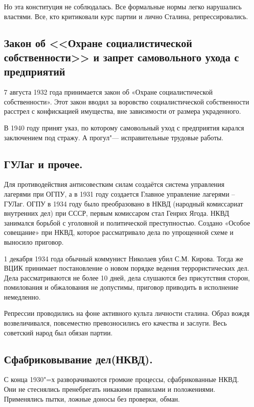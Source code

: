 Но эта конституция не соблюдалась. Все формальные нормы легко нарушались властями. Все, кто критиковали курс партии и лично Сталина, репрессировались.

\subsection{Закон об <<Охране социалистической собственности>> и запрет самовольного ухода с предприятий}

7 августа 1932 года принимается закон об «Охране социалистической собственности». Этот закон вводил за воровство социалистической собственности расстрел с конфискацией имущества, вне зависимости от размера украденного.

В 1940 году принят указ, по которому самовольный уход с предприятия карался заключением под стражу. А прогул"--- исправительные трудовые работы.

\subsection{ГУЛаг и прочее.}

Для противодействия антисовестким силам создаётся система управления лагерями при ОГПУ, а в 1931 году создается Главное управление лагерями – ГУЛаг. ОГПУ в 1934 году было преобразовано в НКВД (народный комиссариат внутренних дел) при СССР, первым комиссаром стал Генрих Ягода. НКВД занимался борьбой с уголовной и политической преступностью. Создано «Особое совещание» при НКВД, которое рассматривало дела по упрощенной схеме и выносило приговор.

1 декабря 1934 года обычный коммунист Николаев убил С.М. Кирова. Тогда же ВЦИК принимает постановление о новом порядке ведения террористических дел. Дела рассматриваются не более 10 дней, дела слушаются без присутствия сторон, помилования и обжалования не допустимы, приговор приводить в исполнение немедленно.

Репрессии проводились на фоне активного культа личности сталина. Образ вождя возвеличивался, повсеместно превозносились его качества и заслуги. Весь советский народ был обязан партии.

\subsection{Сфабриковывание дел(НКВД).}

С конца 1930"=х разворачиваются громкие процессы, сфабрикованные НКВД. Они не стеснялись пренебрегать никакими правилами и положениями. Применялись пытки, ложные доносы без проверки, обман. 

